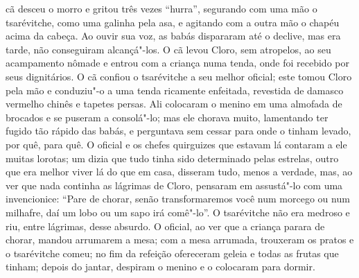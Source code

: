 cã desceu o morro e gritou três vezes ``hurra'', segurando com uma mão o tsarévitche, como uma galinha
pela asa, e agitando com a outra mão o chapéu acima da cabeça. Ao ouvir sua voz, as babás dispararam até o
declive, mas era tarde, não conseguiram alcançá"-los. O cã levou Cloro, sem atropelos, ao seu acampamento nômade e entrou com a criança numa
tenda, onde foi recebido por seus dignitários. O cã confiou o
tsarévitche a seu melhor oficial; este tomou Cloro pela mão e conduziu"-o
a uma tenda ricamente enfeitada, revestida de damasco vermelho chinês e
tapetes persas. Ali colocaram o menino em uma almofada de brocados e se
puseram a consolá"-lo; mas ele chorava muito, lamentando ter fugido tão
rápido das babás, e perguntava sem cessar para onde o tinham levado, por
quê, para quê. O oficial e os chefes quirguizes que estavam lá contaram
a ele muitas lorotas; um dizia que tudo tinha sido determinado pelas
estrelas, outro que era melhor viver lá do que em casa, disseram tudo,
menos a verdade, mas, ao ver que nada continha as lágrimas de Cloro,
pensaram em assustá"-lo com uma invencionice: ``Pare de chorar, senão
transformaremos você num morcego ou num milhafre, daí um lobo ou um sapo
irá comê"-lo''. O tsarévitche não era medroso e riu, entre lágrimas,
desse absurdo. O oficial, ao ver que a criança parara de chorar, mandou
arrumarem a mesa; com a mesa arrumada, trouxeram os pratos e o
tsarévitche comeu; no fim da refeição ofereceram geleia e todas as
frutas que tinham; depois do jantar, despiram o menino e o colocaram
para dormir.

